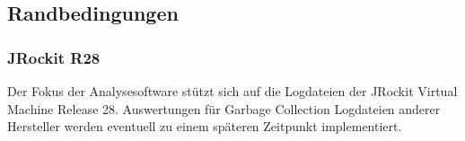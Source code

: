 \subsection{Randbedingungen}\label{randbedingungen}
\subsubsection{JRockit R28}
Der Fokus der Analysesoftware stützt sich auf die Logdateien der JRockit Virtual Machine Release 28. Auswertungen für Garbage Collection Logdateien anderer Hersteller werden eventuell zu einem späteren Zeitpunkt implementiert. 




